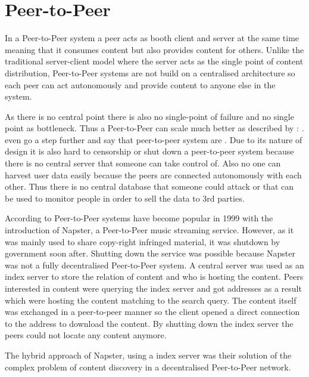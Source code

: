 \section{Peer-to-Peer}
In a Peer-to-Peer system a peer acts as booth client and server at the same time meaning that it consumes content but also provides content for others. Unlike the traditional server-client model where the server acts as the single point of content distribution, Peer-to-Peer systems are not build on a centralised architecture so each peer can act autonomously and provide content to anyone else in the system.

As there is no central point there is also no single-point of failure and no single point as bottleneck. Thus a Peer-to-Peer can scale much better as described by \citet[\S1]{newscast-gossiping}:
. \citet[\S7.5.4]{tanenbaum_wetherall_2011} even go a step further and say that peer-to-peer system are .
Due to its nature of design it is also hard to censorship or shut down a peer-to-peer system because there is no central server that someone can take control of. Also no one can harvest user data easily because the peers are connected autonomously with each other. Thus there is no central database that someone could attack or that can be used to monitor people in order to sell the data to 3rd parties.

According to \citet{tanenbaum_wetherall_2011} Peer-to-Peer systems have become popular in 1999 with the introduction of Napster, a Peer-to-Peer music streaming service. However, as it was mainly used to share copy-right infringed material, it was shutdown by government soon after. Shutting down the service was possible because Napster was not a fully decentralised Peer-to-Peer system. A central server was used as an index server to store the relation of content and who is hosting the content. Peers interested in content were querying the index server and got addresses as a result which were hosting the content matching to the search query. The content itself was exchanged in a peer-to-peer manner so the client opened a direct connection to the address to download the content. By shutting down the index server the peers could not locate any content anymore. 

The hybrid approach of Napster, using a index server was their solution of the complex problem of content discovery in a decentralised Peer-to-Peer network.

